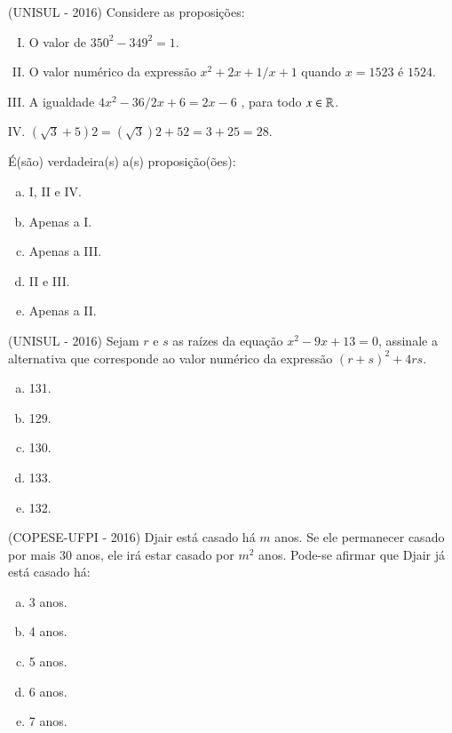  \begin{exer}
  (UNISUL - 2016) Considere as proposições:
 \begin{enumerate}[I)]
 \item O valor de $350^2 - 349^2 = 1$.
 \item O valor numérico da expressão  $x^2+ 2x + 1 / x+1$ quando $x = 1523$ é $1524$.
 \item A igualdade $4x^2 - 36 / 2x + 6 = 2x - 6$ , para todo $x \in \mathbb{R}$.
 \item $(\sqrt{3} + 5)2 = (\sqrt{3})2 + 52 = 3 + 25 =28$.
 \end{enumerate}
 É(são) verdadeira(s) a(s) proposição(ões):
 \begin{enumerate}[a)]
 \item I, II e IV.
 \item Apenas a I.
 \item Apenas a III.
 \item II e III.
 \item Apenas a II.
 \end{enumerate}
 \end{exer}

 \begin{exer}
 (UNISUL - 2016) Sejam $r$ e $s$ as raízes da equação $x^2 - 9x + 13 = 0$, assinale a alternativa que corresponde ao valor numérico da expressão $(r + s)^2 + 4rs$.
 \begin{multicols}{5}
 \begin{enumerate}[a)]
 \item 131.
 \item 129.
 \item 130.
 \item 133.
 \item 132.
 \end{enumerate}
 \end{multicols}
 \end{exer}

 \begin{exer}
 (COPESE-UFPI - 2016) Djair está casado há $m$ anos. Se ele permanecer casado por mais $30$ anos, ele irá estar casado por $m^2$ anos. Pode-se afirmar que Djair já está casado há:
 \begin{multicols}{5}
 \begin{enumerate}[a)]
 \item 3 anos.
 \item 4 anos.
 \item 5 anos.
 \item 6 anos.
 \item 7 anos.
 \end{enumerate}
 \end{multicols}
 \end{exer}

